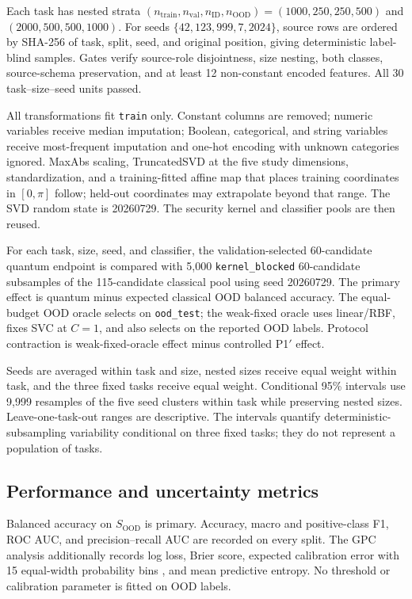 \documentclass[referee,lineno,pdflatex,sn-vancouver-num]{sn-jnl}
\theoremstyle{thmstyleone}%
\theoremstyle{thmstyletwo}%
\theoremstyle{thmstylethree}%
\begin{document}
Each task has nested strata $(n_{\mathrm{train}},n_{\mathrm{val}},n_{\mathrm{ID}},n_{\mathrm{OOD}})=(1000,250,250,500)$ and $(2000,500,500,1000)$. For seeds $\{42,123,999,7,2024\}$, source rows are ordered by SHA-256 of task, split, seed, and original position, giving deterministic label-blind samples. Gates verify source-role disjointness, size nesting, both classes, source-schema preservation, and at least 12 non-constant encoded features. All 30 task--size--seed units passed.

All transformations fit \texttt{train} only. Constant columns are removed; numeric variables receive median imputation; Boolean, categorical, and string variables receive most-frequent imputation and one-hot encoding with unknown categories ignored. MaxAbs scaling, TruncatedSVD at the five study dimensions, standardization, and a training-fitted affine map that places training coordinates in $[0,\pi]$ follow; held-out coordinates may extrapolate beyond that range. The SVD random state is 20260729. The security kernel and classifier pools are then reused.

For each task, size, seed, and classifier, the validation-selected 60-candidate quantum endpoint is compared with 5,000 \texttt{kernel\_blocked} 60-candidate subsamples of the 115-candidate classical pool using seed 20260729. The primary effect is quantum minus expected classical OOD balanced accuracy. The equal-budget OOD oracle selects on \texttt{ood\_test}; the weak-fixed oracle uses linear/RBF, fixes SVC at $C=1$, and also selects on the reported OOD labels. Protocol contraction is weak-fixed-oracle effect minus controlled P1$'$ effect.

Seeds are averaged within task and size, nested sizes receive equal weight within task, and the three fixed tasks receive equal weight. Conditional 95\% intervals use 9,999 resamples of the five seed clusters within task while preserving nested sizes. Leave-one-task-out ranges are descriptive. The intervals quantify deterministic-subsampling variability conditional on three fixed tasks; they do not represent a population of tasks.

\subsection{Performance and uncertainty metrics}

Balanced accuracy on $S_{\mathrm{OOD}}$ is primary. Accuracy, macro and positive-class F1, ROC AUC, and precision--recall AUC are recorded on every split. The GPC analysis additionally records log loss, Brier score, expected calibration error with 15 equal-width probability bins \cite{guo2017calibration}, and mean predictive entropy. No threshold or calibration parameter is fitted on OOD labels.
\end{document}
